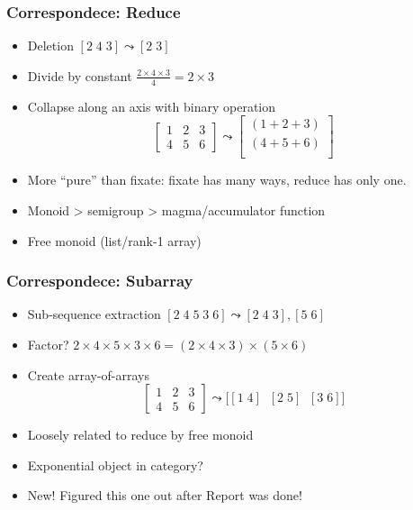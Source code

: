 \documentclass[xetex,mathserif,serif]{beamer}
\begin{document}
\begin{frame}
  \frametitle{Correspondece: Reduce}
  \pause
  \begin{itemize}[<+->]
    \item Deletion \([2\;4\;3] \leadsto [2\;3]\)
    \item Divide by constant \(\frac{2\times4\times3}4 = 2\times3\)
    \item Collapse along an axis with binary operation
      \[
        \begin{bmatrix}
          1 & 2 & 3 \\
          4 & 5 & 6
        \end{bmatrix} \leadsto
        \begin{bmatrix}
          (1 + 2 + 3) \\
          (4 + 5 + 6) \\
        \end{bmatrix}
      \]
    \item More ``pure'' than fixate: fixate has many ways,
      reduce has only one.
    \item Monoid > semigroup > magma/accumulator function
    \item Free monoid (list/rank-1 array)
  \end{itemize}
\end{frame}

\begin{frame}
  \frametitle{Correspondece: Subarray}
  \pause
  \begin{itemize}[<+->]
    \item Sub-sequence extraction \([2\;4\;5\;3\;6] \leadsto [2\;4\;3], [5\;6]\)
    \item Factor? \(2\times4\times5\times3\times6 = (2\times4\times3)\times(5\times6)\)
    \item Create array-of-arrays
      \[
        \begin{bmatrix}
          1 & 2 & 3 \\
          4 & 5 & 6
        \end{bmatrix} \leadsto \big[[1\;4]\;\;[2\;5]\;\;[3\;6]\big]
      \]
    \item Loosely related to reduce by free monoid
    \item Exponential object in category?
    \item New! Figured this one out after Report was done!
  \end{itemize}
\end{frame}
\end{document}
